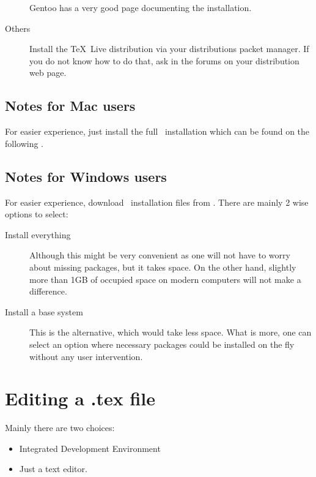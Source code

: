 \begin{description}
        Gentoo has a very good
        page documenting the installation.
    \item[Others]
        Install the \TeX\ Live distribution via your distributions packet
        manager. If you do not know how to do that, ask in the forums on your
        distribution web page.
\end{description}

\subsection{Notes for Mac users}

For easier experience, just install the full \MacTeX\ installation which can be
found on the following .

\subsection{Notes for Windows users}

For easier experience, download \MiKTeX\ installation files from
.
There are mainly 2 wise options to select:
\begin{description}
    \item[Install everything] Although this might be very convenient as
        one will not have to worry about missing packages, but it takes space.
        On the other hand, slightly more than 1GB of occupied space on modern
        computers will not make a difference.
    \item[Install a base system] This is the alternative, which would take less
        space. What is more, one can select an option where necessary packages
        could be installed on the fly without any user intervention.
\end{description}

\section{Editing a .tex file}

Mainly there are two choices:
\begin{itemize}
    \item Integrated Development Environment
    \item Just a text editor.
\end{itemize}


